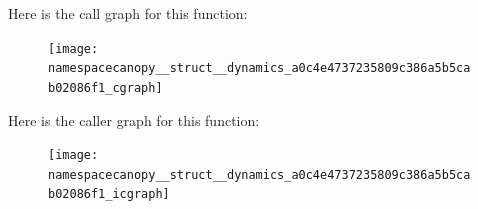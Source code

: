 Here is the call graph for this function\+:
\nopagebreak
\begin{figure}[H]
\begin{center}
\leavevmode
\texttt{[image: namespacecanopy\_\_struct\_\_dynamics\_a0c4e4737235809c386a5b5cab02086f1\_cgraph]}
\end{center}
\end{figure}
Here is the caller graph for this function\+:
\nopagebreak
\begin{figure}[H]
\begin{center}
\leavevmode
\texttt{[image: namespacecanopy\_\_struct\_\_dynamics\_a0c4e4737235809c386a5b5cab02086f1\_icgraph]}
\end{center}
\end{figure}
